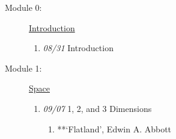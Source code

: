 \documentclass[article,oneside]{memoir}
\begin{document}
\begin{description}
\item[Module 0:] \href{http://scoconno.github.io/Teaching/Metaphysics/Intro}{Introduction}
\begin{enumerate}
\item \textit{08/31} Introduction
\end{enumerate}
\item[Module 1:] \href{http://scoconno.github.io/Teaching/Metaphysics/Space}{Space} 
\begin{enumerate}
\item \textit{09/07} 1, 2, and 3 Dimensions
\begin{enumerate}
\item **`Flatland', Edwin A. Abbott
\end{enumerate}


\end{enumerate}
\end{description}
\end{document}
